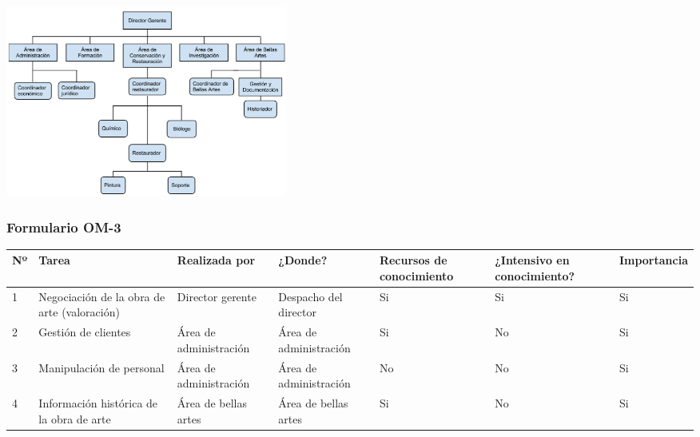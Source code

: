 \documentclass[a4paper,11pt]{article}
\begin{document}
\begin{center}
\begin{tabular}{| p{2.5cm} | p{9cm} |}
					\hline
				\end{tabular}\\
				\newpage
				\includegraphics[width=350px]{organigrama.png} \\
			\end{center}
			\newpage
			\begin{landscape}
			\subsubsection{Formulario OM-3}
			\begin{center}
				\begin{tabular}{| l | p{4cm} | p{2.8cm} | p{2cm} | p{2cm} | p{3cm} |
				p{2.2cm} |}
					\hline
					\textbf{Nº} & \textbf{Tarea} & \textbf{Realizada por} & \textbf{¿Donde?} & \textbf{Recursos de conocimiento} &
					\textbf{¿Intensivo en conocimiento?} & \textbf{Importancia}\\
					\hline
					1 & Negociación de la obra de arte (valoración) & Director gerente &
					Despacho del director & Si & Si & Si\\
					\hline
					2 & Gestión de clientes & Área de administración & Área de administración
					& Si & No & Si\\
					\hline
					3 & Manipulación de personal & Área de administración & Área de
					administración & No & No & Si\\
					\hline
					4 & Información histórica de la obra de arte & Área de bellas artes & Área
					de bellas artes & Si & No & Si\\
					\hline
				\end{tabular}
			\end{center}
			\end{landscape}
			\newpage
\end{document}
